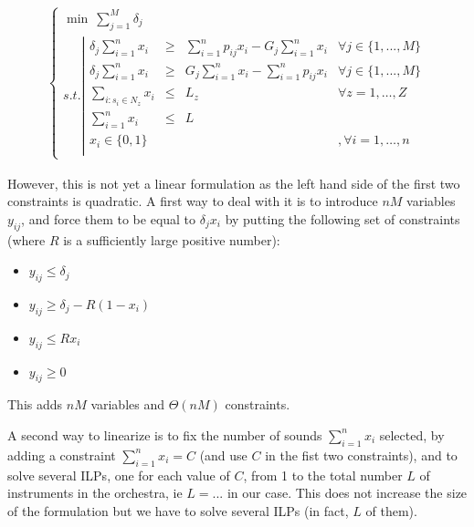 \documentclass[a4paper]{book}
\begin{document}
\begin{center}
   \begin{eqnarray*}
     \ \left \{ \begin{array}{ll}
    \min \ \sum\limits_{j=1}^M \delta_j \\
    s.t. \left |
    \begin{array}{llllll}
    \delta_j \sum_{i=1}^n x_i & \geq & \sum\limits_{i=1}^n p_{ij}x_i-G_j\sum_{i=1}^n x_i  & \forall{j} \in \{1,...,M\} \\
    \delta_j  \sum_{i=1}^n x_i  & \geq &G_j\sum_{i=1}^n x_i - \sum\limits_{i=1}^n p_{ij}x_i  & \forall{j} \in \{1,...,M\} \\
         \sum\limits_{i:s_i\in N_z}  x_{i} & \leq &L_z & \forall z=1,\dots,Z \\
                  \sum\limits_{i=1}^n  x_{i} & \leq &L &  \\
 
    x_{i} \in \{0,1\} & & &, \forall{i}=1,\dots,n\\
    \end{array}
    \right.
    \end{array} 
    \right.
    \end{eqnarray*}
    \end{center}

However, this is not yet a linear formulation as the left hand side of the first two constraints is quadratic. A first way to deal with it is to introduce $nM$ variables $y_{ij}$, and force them to be equal to $\delta_j x_i$ by putting the following set of constraints (where $R$ is a sufficiently large positive number):
\begin{itemize}
    \item $y_{ij}\leq \delta_j$
    \item $y_{ij}\geq \delta_j-R(1-x_i)$
    \item $y_{ij}\leq Rx_i$
    \item $y_{ij}\geq 0$
\end{itemize}
This adds $nM$ variables and $\Theta(nM)$ constraints. 

A second way to linearize is to fix the number of sounds $\sum_{i=1}^n x_i$ selected, by adding a constraint $\sum_{i=1}^n x_i=C$ (and use $C$ in the fist two constraints), and to solve several ILPs, one for each value of $C$, from 1 to the total number $L$ of instruments in the orchestra, ie $L=...$ in our case. This  does not increase the size of the formulation but we have to solve several ILPs (in fact, $L$ of them). 
\end{document}
